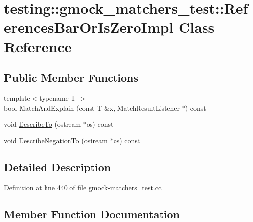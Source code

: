 \hypertarget{classtesting_1_1gmock__matchers__test_1_1_references_bar_or_is_zero_impl}{}\section{testing\+:\+:gmock\+\_\+matchers\+\_\+test\+:\+:References\+Bar\+Or\+Is\+Zero\+Impl Class Reference}
\label{classtesting_1_1gmock__matchers__test_1_1_references_bar_or_is_zero_impl}
\subsection*{Public Member Functions}
\begin{DoxyCompactItemize}
\item 
{\footnotesize template$<$typename T $>$ }\\bool \hyperlink{classtesting_1_1gmock__matchers__test_1_1_references_bar_or_is_zero_impl_a80c748aab6200486118449625689e76a}{Match\+And\+Explain} (const \hyperlink{functions__7_8js_adf1f3edb9115acb0a1e04209b7a9937b}{T} \&x, \hyperlink{classtesting_1_1_match_result_listener}{Match\+Result\+Listener} $\ast$) const 
\item 
void \hyperlink{classtesting_1_1gmock__matchers__test_1_1_references_bar_or_is_zero_impl_ae2be57a63162de12626a503ffaa986b4}{Describe\+To} (ostream $\ast$os) const 
\item 
void \hyperlink{classtesting_1_1gmock__matchers__test_1_1_references_bar_or_is_zero_impl_aa1c5da8f340427b804e93fe3c00f0165}{Describe\+Negation\+To} (ostream $\ast$os) const 
\end{DoxyCompactItemize}


\subsection{Detailed Description}


Definition at line 440 of file gmock-\/matchers\+\_\+test.\+cc.



\subsection{Member Function Documentation}
